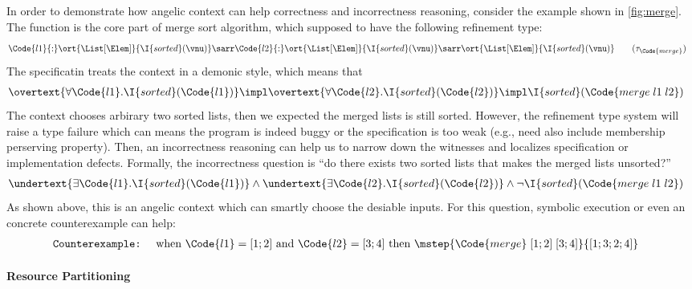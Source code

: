In order to demonstrate how angelic context can help correctness and incorrectness reasoning, consider the example shown in \autoref{fig:merge}. The function  is the core part of merge sort algorithm, which supposed to have the following refinement type:
\begin{align*}
    &\Code{l1}{:}\ort{\List[\Elem]}{\I{sorted}(\vnu)} \sarr \Code{l2}{:}\ort{\List[\Elem]}{\I{sorted}(\vnu)} \sarr \ort{\List[\Elem]}{\I{sorted}(\vnu)} \tag{$\tau_{\Code{merge}}$}
\end{align*}\noindent
The specificatin treats the context in a demonic style, which means that
\begin{align*}
    &\overtext{\forall \Code{l1}.\I{sorted}(\Code{l1})} \impl \overtext{\forall \Code{l2}. \I{sorted}(\Code{l2})} \impl \I{sorted}(\Code{merge\;l1\;l2})
\end{align*}\noindent
The context chooses arbirary two sorted lists, then we expected the merged lists is still sorted. However, the refinement type system will raise a type failure which can means the program is indeed buggy or the specification is too weak (e.g., need also include membership perserving property). Then, an incorrectness reasoning can help us to narrow down the witnesses and localizes specification or implementation defects. Formally, the incorrectness question is ``do there exists two sorted lists that makes the merged lists unsorted?''
\begin{align*}
    &\undertext{\exists \Code{l1}. \I{sorted}(\Code{l1})} \land \undertext{\exists \Code{l2}. \I{sorted}(\Code{l2})} \land \neg \I{sorted}(\Code{merge\;l1\;l2}) 
\end{align*}\noindent
As shown above, this is an angelic context which can smartly choose the desiable inputs. For this question, symbolic execution or even an concrete counterexample can help:
\begin{align*}
    \texttt{Counterexample:}&\quad  \text{ when } \Code{l1} = [1;2] \text{ and } \Code{l2} = [3;4] \text{ then } \mstep{\Code{merge}\;[1;2]\;[3;4]}{[1;3;2;4]}
\end{align*}\noindent

\paragraph{Resource Partitioning}

